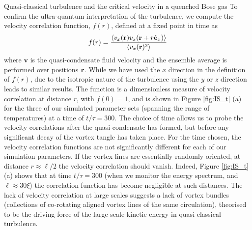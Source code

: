 \begin{chapter}{\label{cha:nonequib}Quasi-classical turbulence and the critical velocity in a quenched Bose gas}
To confirm the ultra-quantum interpretation of the turbulence, we compute the velocity correlation function, $f(r)$, defined at a fixed point in time as
\begin{equation}
f(r) = \frac{\langle v_x({\bf r})v_x({\bf r} +  r\hat{\bf e}_x) \rangle}{\langle v_x({\bf r})^2 \rangle}
\end{equation}
where $\mathbf{v}$ is the quasi-condensate fluid velocity and the ensemble average is performed over positions ${\bf r}$. While we have used the $x$ direction in the definition of $f(r)$, due to the isotropic nature of the turbulence using the $y$ or $z$ direction leads to similar results. The function is a dimensionless measure of velocity correlation at distance $r$, with $f(0)=1$, and is shown in Figure \ref{fig:IS_t} (a) for the three of our simulated parameter sets (spanning the range of temperatures) at a time of $t/\tau = 300$. The choice of time allows us to probe the velocity correlations after the quasi-condensate has formed, but before any significant decay of the vortex tangle has taken place. For the time chosen, the velocity correlation functions are not significantly different for each of our simulation parameters. %
If the vortex lines are essentially randomly oriented, at distance $r \approx \ell/2$ the velocity correlation should vanish. Indeed, Figure \ref{fig:IS_t} (a) shows that at time $t/\tau=300$ (when we monitor the
energy spectrum, and $\ell \approx 30 \xi$) the correlation function has become negligible at such distances.
The lack of velocity correlation at large scales suggests a lack of vortex bundles (collections of co-rotating aligned vortex lines of the same circulation), theorised to be the driving force of the large scale kinetic energy in quasi-classical turbulence.


\end{chapter}
